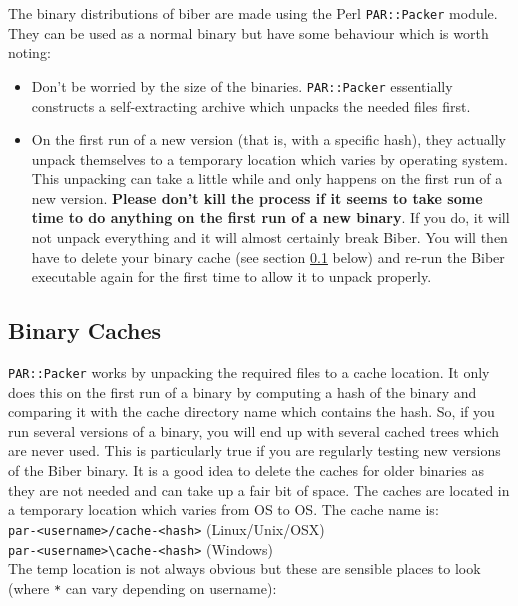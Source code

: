 \documentclass{ltxdockit}
\begin{document}
The binary distributions of biber are made using the Perl \verb+PAR::Packer+
module. They can be used as a normal binary but have some behaviour which
is worth noting:

\begin{itemize}
\item Don't be worried by the size of the binaries. \verb+PAR::Packer+ essentially
  constructs a self-extracting archive which unpacks the needed files first.
\item On the first run of a new version (that is, with a specific hash),
  they actually unpack themselves to a temporary location which varies by
  operating system. This unpacking can take a little while and only happens
  on the first run of a new version. \textbf{Please don't kill the process
    if it seems to take some time to do anything on the first run of a new
    binary}. If you do, it will not unpack everything and it will almost
  certainly break Biber. You will then have to delete your binary
  cache (see section \ref{bc} below) and re-run the Biber executable
  again for the first time to allow it to unpack properly.
\end{itemize}

\subsection{Binary Caches}\label{bc}

\verb+PAR::Packer+ works by unpacking the required files to a cache
location. It only does this on the first run of a binary 
by computing a hash of the binary and comparing it with
the cache directory name which contains the hash. So, if you run
several versions of a binary, you will end up with several cached
trees which are never used. This is particularly true if you are regularly
testing new versions of the Biber binary. It is a good idea to
delete the caches for older binaries as they are not needed and can take up
a fair bit of space. The caches are located in a temporary location which
varies from OS to OS. The cache name is:\\[1ex]

\noindent\verb+par-<username>/cache-<hash>+ (Linux/Unix/OSX)\\
\verb+par-<username>\cache-<hash>+ (Windows)\\[1ex]

\noindent The temp location is not always obvious but these are sensible
places to look (where \verb+*+ can vary depending on username):
\end{document}

